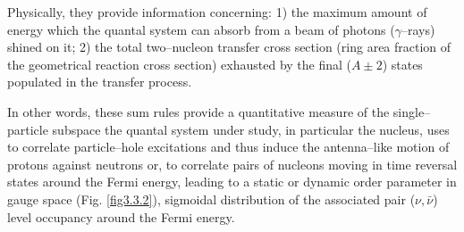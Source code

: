 %








 Physically, they provide  information concerning: 1) the maximum amount of energy which the quantal system can absorb from a beam of photons ($\gamma$--rays) shined on it; 2) the total two--nucleon transfer cross section (ring area fraction of the geometrical reaction cross section) exhausted by the final ($A\pm2$) states populated in the transfer process.







In other words, these sum rules provide a quantitative measure of the single--particle subspace the quantal system under study, in particular the nucleus, uses to correlate particle--hole excitations and thus induce the antenna--like motion of protons against neutrons or, to correlate pairs of nucleons moving in time reversal states around the Fermi energy, leading to a static or dynamic order parameter in gauge space (Fig. \ref{fig3.3.2}), sigmoidal distribution of the associated pair ($\nu,\bar{\nu}$) level occupancy around the Fermi energy. 


